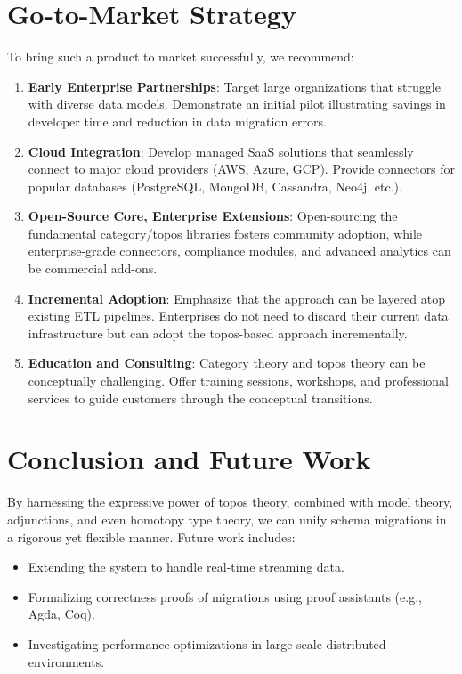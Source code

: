 \documentclass[11pt]{article}
\begin{document}
\section{Go-to-Market Strategy}
To bring such a product to market successfully, we recommend:
\begin{enumerate}
\item \textbf{Early Enterprise Partnerships}: Target large organizations that struggle with diverse data models. Demonstrate an initial pilot illustrating savings in developer time and reduction in data migration errors.
\item \textbf{Cloud Integration}: Develop managed SaaS solutions that seamlessly connect to major cloud providers (AWS, Azure, GCP). Provide connectors for popular databases (PostgreSQL, MongoDB, Cassandra, Neo4j, etc.).
\item \textbf{Open-Source Core, Enterprise Extensions}: Open-sourcing the fundamental category/topos libraries fosters community adoption, while enterprise-grade connectors, compliance modules, and advanced analytics can be commercial add-ons.
\item \textbf{Incremental Adoption}: Emphasize that the approach can be layered atop existing ETL pipelines. Enterprises do not need to discard their current data infrastructure but can adopt the topos-based approach incrementally.
\item \textbf{Education and Consulting}: Category theory and topos theory can be conceptually challenging. Offer training sessions, workshops, and professional services to guide customers through the conceptual transitions.
\end{enumerate}

\section{Conclusion and Future Work}
By harnessing the expressive power of topos theory, combined with model theory, adjunctions, and even homotopy type theory, we can unify schema migrations in a rigorous yet flexible manner. Future work includes:
\begin{itemize}
    \item Extending the system to handle real-time streaming data.  
    \item Formalizing correctness proofs of migrations using proof assistants (e.g., Agda, Coq).  
    \item Investigating performance optimizations in large-scale distributed environments.
\end{itemize}
\end{document}
